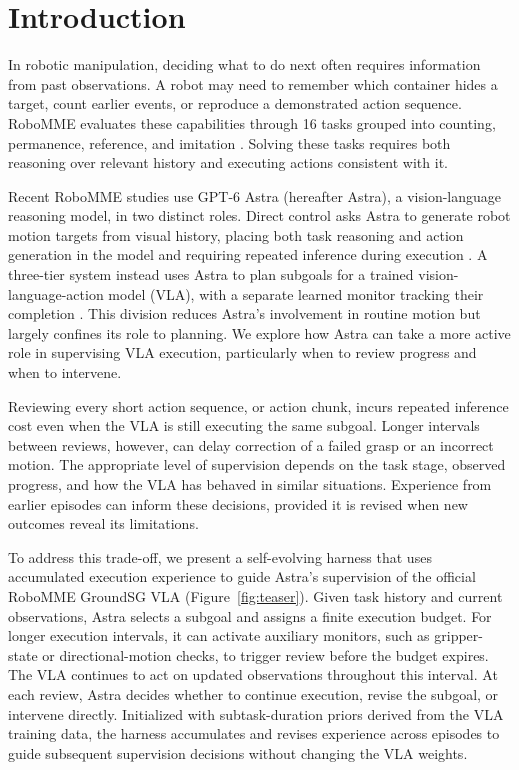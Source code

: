 \section{Introduction}
\label{sec:introduction}

In robotic manipulation, deciding what to do next often requires information from past observations. A robot may need to remember which container hides a target, count earlier events, or reproduce a demonstrated action sequence. RoboMME evaluates these capabilities through 16 tasks grouped into counting, permanence, reference, and imitation . Solving these tasks requires both reasoning over relevant history and executing actions consistent with it.

Recent RoboMME studies use GPT-6 Astra (hereafter Astra), a vision-language reasoning model, in two distinct roles. Direct control asks Astra to generate robot motion targets from visual history, placing both task reasoning and action generation in the model and requiring repeated inference during execution . A three-tier system instead uses Astra to plan subgoals for a trained vision-language-action model (VLA), with a separate learned monitor tracking their completion . This division reduces Astra's involvement in routine motion but largely confines its role to planning. We explore how Astra can take a more active role in supervising VLA execution, particularly when to review progress and when to intervene.

Reviewing every short action sequence, or action chunk, incurs repeated inference cost even when the VLA is still executing the same subgoal. Longer intervals between reviews, however, can delay correction of a failed grasp or an incorrect motion. The appropriate level of supervision depends on the task stage, observed progress, and how the VLA has behaved in similar situations. Experience from earlier episodes can inform these decisions, provided it is revised when new outcomes reveal its limitations.

To address this trade-off, we present a self-evolving harness that uses accumulated execution experience to guide Astra's supervision of the official RoboMME GroundSG VLA (Figure~\ref{fig:teaser}). Given task history and current observations, Astra selects a subgoal and assigns a finite execution budget. For longer execution intervals, it can activate auxiliary monitors, such as gripper-state or directional-motion checks, to trigger review before the budget expires. The VLA continues to act on updated observations throughout this interval. At each review, Astra decides whether to continue execution, revise the subgoal, or intervene directly. Initialized with subtask-duration priors derived from the VLA training data, the harness accumulates and revises experience across episodes to guide subsequent supervision decisions without changing the VLA weights.

